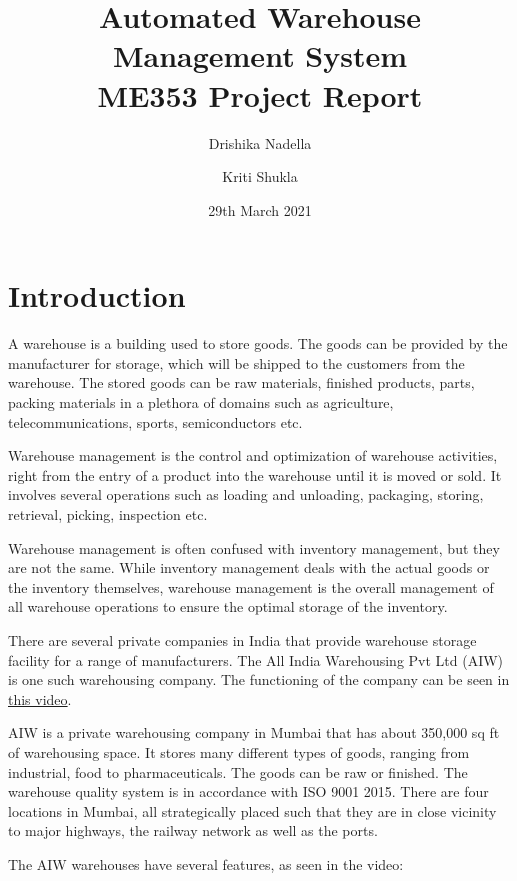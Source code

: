 \documentclass{report}
\title{\bfseries{Automated Warehouse Management System \\ \large{ME353 Project Report}}}
\author[1]{Drishika Nadella}
\author[2]{Kriti Shukla}
\affil[1]{181ME222, Department of Mechanical Engineering, NITK}
\affil[2]{181ME239, Department of Mechanical Engineering, NITK}
\date{29th March 2021}
\begin{document}
\maketitle

\tableofcontents
\listoffigures

\section{Introduction}

A warehouse is a building used to store goods. The goods can be provided by the manufacturer for storage, which will be shipped to the customers from the warehouse. The stored goods can be raw materials, finished products, parts, packing materials in a plethora of domains such as agriculture, telecommunications, sports, semiconductors etc.

Warehouse management is the control and optimization of warehouse activities, right from the entry of a product into the warehouse until it is moved or sold. It involves several operations such as loading and unloading, packaging, storing, retrieval, picking, inspection etc.

Warehouse management is often confused with inventory management, but they are not the same. While inventory management deals with the actual goods or the inventory themselves, warehouse management is the overall management of all warehouse operations to ensure the optimal storage of the inventory.

There are several private companies in India that provide warehouse storage facility for a range of manufacturers. The All India Warehousing Pvt Ltd (AIW) is one such warehousing company. The functioning of the company can be seen in \href{https://www.youtube.com/watch?v=cAQ3jQVAniA}{this video}.

AIW is a private warehousing company in Mumbai that has about 350,000 sq ft of warehousing space. It stores many different types of goods, ranging from industrial, food to pharmaceuticals. The goods can be raw or finished. The warehouse quality system is in accordance with ISO 9001 2015. There are four locations in Mumbai, all strategically placed such that they are in close vicinity to major highways, the railway network as well as the ports.

The AIW warehouses have several features, as seen in the video:
\end{document}

